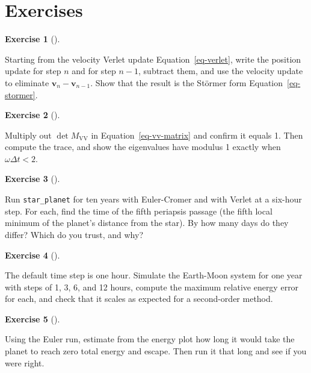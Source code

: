 \documentclass[
  10.5pt,
  letterpaper,
]{scrbook}
\theoremstyle{definition}
\newtheorem{exercise}{Exercise}[chapter]
\theoremstyle{plain}
\theoremstyle{remark}
\begin{document}
\section*{Exercises}\label{exercises-4}


\begin{exercise}[]\protect\hypertarget{exr-ch5-equivalence}{}\label{exr-ch5-equivalence}

Starting from the velocity Verlet update Equation~\ref{eq-verlet}, write
the position update for step \(n\) and for step \(n-1\), subtract them,
and use the velocity update to eliminate
\(\mathbf{v}_n - \mathbf{v}_{n-1}\). Show that the result is the Störmer
form Equation~\ref{eq-stormer}.

\end{exercise}

\begin{exercise}[]\protect\hypertarget{exr-ch5-vv-det}{}\label{exr-ch5-vv-det}

Multiply out \(\det M_{\mathrm{VV}}\) in Equation~\ref{eq-vv-matrix} and
confirm it equals 1. Then compute the trace, and show the eigenvalues
have modulus 1 exactly when \(\omega\Delta t < 2\).

\end{exercise}

\begin{exercise}[]\protect\hypertarget{exr-ch5-cromer-phase}{}\label{exr-ch5-cromer-phase}

Run \texttt{star\_planet} for ten years with Euler-Cromer and with
Verlet at a six-hour step. For each, find the time of the fifth
periapsis passage (the fifth local minimum of the planet's distance from
the star). By how many days do they differ? Which do you trust, and why?

\end{exercise}

\begin{exercise}[]\protect\hypertarget{exr-ch5-moon-step}{}\label{exr-ch5-moon-step}

The default time step is one hour. Simulate the Earth-Moon system for
one year with steps of 1, 3, 6, and 12 hours, compute the maximum
relative energy error for each, and check that it scales as expected for
a second-order method.

\end{exercise}

\begin{exercise}[]\protect\hypertarget{exr-ch5-euler-escape}{}\label{exr-ch5-euler-escape}

Using the Euler run, estimate from the energy plot how long it would
take the planet to reach zero total energy and escape. Then run it that
long and see if you were right.

\end{exercise}
\end{document}
